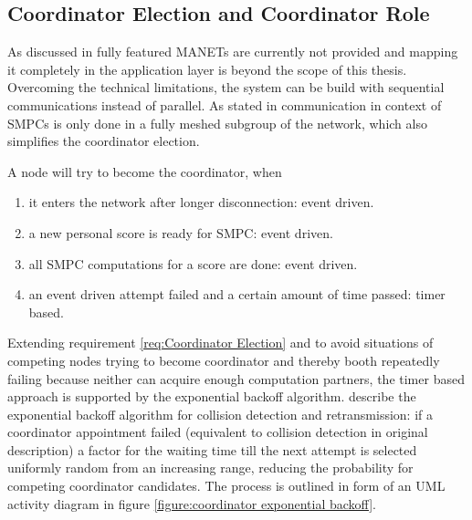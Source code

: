 \subsection{Coordinator Election and Coordinator Role} \label{Coordinator Election}

As discussed in  fully featured \glspl{MANET} are currently not provided and mapping it completely in the application layer is beyond the scope of this thesis. Overcoming the technical limitations, the system can be build with sequential communications instead of parallel. As stated in  communication in context of \glspl{SMPC} is only done in a fully meshed subgroup of the network, which also simplifies the coordinator election.

\noindent A node will try to become the coordinator, when \nolinebreak
\begin{enumerate}
	\item it enters the network after longer disconnection: event driven.
	\item a new personal score is ready for \gls{SMPC}: event driven.
	\item all \gls{SMPC} computations for a score are done: event driven.
	\item an event driven attempt failed and a certain amount of time passed: timer based.
\end{enumerate}

Extending requirement \ref{req:Coordinator Election} and to avoid situations of competing nodes trying to become coordinator and thereby booth repeatedly failing because neither can acquire enough computation partners, the timer based approach is supported by the exponential backoff algorithm. \textcite[p.67]{IEEE2010} describe the exponential backoff algorithm for collision detection and retransmission: if a coordinator appointment failed (equivalent to collision detection in original description) a factor for the waiting time till the next attempt is selected uniformly random from an increasing range, reducing the probability for competing coordinator candidates. The process is outlined in form of an \gls{UML} activity diagram in figure \ref{figure:coordinator exponential backoff}.

